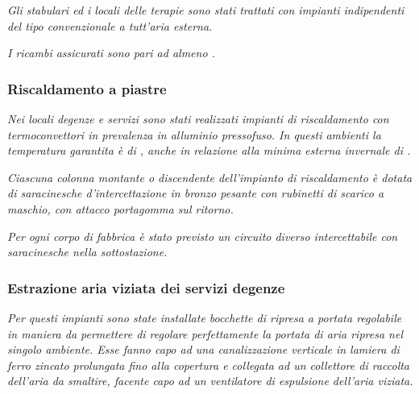\begin{quoting}
	\emph{Gli stabulari ed i locali delle terapie sono stati trattati con impianti indipendenti del tipo convenzionale a tutt'aria esterna.}
	
	\emph{I ricambi assicurati sono pari ad almeno .}
	
	\sdots
	\subsubsection{Riscaldamento a piastre}
	\emph{Nei locali degenze e servizi sono stati realizzati impianti di riscaldamento con termoconvettori in prevalenza in alluminio pressofuso. In questi ambienti la temperatura garantita è di , anche in relazione alla minima esterna invernale di .}
	
	\sdots
	
	\emph{Ciascuna colonna montante o discendente dell'impianto di riscaldamento è dotata di saracinesche d'intercettazione in bronzo pesante con rubinetti di scarico a maschio, con attacco portagomma sul ritorno.}
	
	\emph{Per ogni corpo di fabbrica è stato previsto un circuito diverso intercettabile con saracinesche nella sottostazione.}
	\subsubsection{Estrazione aria viziata dei servizi degenze}
	\emph{Per questi impianti sono state installate bocchette di ripresa a portata regolabile in maniera da permettere di regolare perfettamente la portata di aria ripresa nel singolo ambiente. Esse fanno capo ad una canalizzazione verticale in lamiera di ferro zincato prolungata fino alla copertura e collegata ad un collettore di raccolta dell'aria da smaltire, facente capo ad un ventilatore di espulsione dell'aria viziata.}
\end{quoting}



